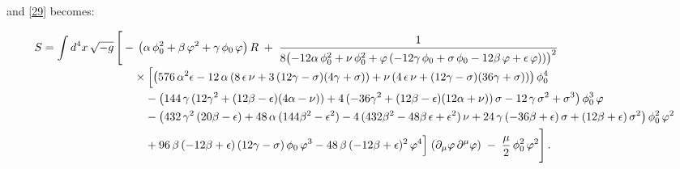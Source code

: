 \documentclass[aps,prd,reprint,preprintnumbers,showpacs,floatfix,nofootinbib,superscript address]{revtex4-2}
\begin{document}
and \cref{29} becomes:
\begin{widetext}
\begin{subequations}
\begin{align}  \label{42a}
S = \int d^4x\,\sqrt{-g}\,\Biggl[ 
  &-\,\bigl(\alpha\,\phi_0^2 + \beta\,\varphi^2 + \gamma\,\phi_0\,\varphi\bigr)\,R
  \;+\;
    \frac{1}{8\bigl(-12\alpha\,\phi_0^2 + \nu\,\phi_0^2 
      + \varphi\,(-12\gamma\,\phi_0 + \sigma\,\phi_0 - 12\beta\,\varphi + \epsilon\,\varphi))\bigr)^2}
    \nonumber\\[-0.5ex]
  &\quad\times
    \Bigl[
      \bigl(576\,\alpha^2\epsilon 
        -12\,\alpha\,(8\,\epsilon\,\nu + 3\,(12\gamma - \sigma)(4\gamma + \sigma))
        + \nu\,(4\,\epsilon\,\nu + (12\gamma - \sigma)(36\gamma + \sigma))
      \bigr)\,\phi_0^4 
    \nonumber\\
  &\quad\quad
    -\bigl(
      144\,\gamma\,(12\gamma^2 + (12\beta - \epsilon)(4\alpha - \nu))
      +4\,(-36\gamma^2 + (12\beta - \epsilon)(12\alpha + \nu))\,\sigma
      -12\,\gamma\,\sigma^2
      +\sigma^3
    \bigr)\,\phi_0^3\,\varphi
    \nonumber\\
  &\quad\quad
    -\bigl(
      432\,\gamma^2\,(20\beta - \epsilon)
      +48\,\alpha\,(144\beta^2 - \epsilon^2)
      -4\,(432\beta^2 - 48\beta\,\epsilon + \epsilon^2)\,\nu
      +24\,\gamma\,(-36\beta + \epsilon)\,\sigma
      +(12\beta + \epsilon)\,\sigma^2
    \bigr)\,\phi_0^2\,\varphi^2
    \nonumber\\
  &\quad\quad
    +96\,\beta\,(-12\beta + \epsilon)\,(12\gamma - \sigma)\,\phi_0\,\varphi^3
    -48\,\beta\,(-12\beta + \epsilon)^2\,\varphi^4
    \Bigr]
    \;(\partial_{\mu}\varphi\,\partial^{\mu}\varphi)
  \;-\;\frac{\mu}{2}\,\phi_0^2\,\varphi^2
\Biggr]\,.
\end{align}
\end{subequations}
\end{widetext}
\end{document}
